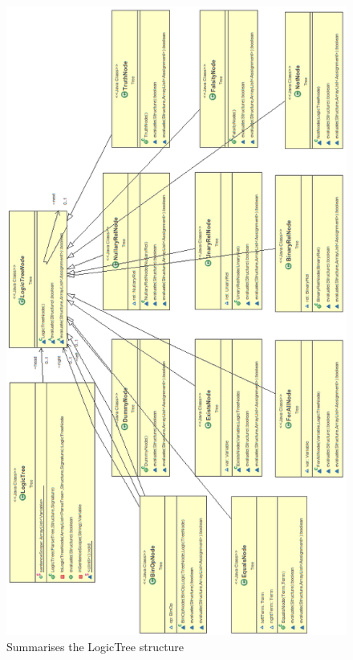 \documentclass{report}
\begin{document}
\begin{figure}[h!]
\centering \includegraphics[height=\textheight]{treeNodes.png}
\caption{Summarises the LogicTree structure}
\end{figure}
\newpage

\newpage


\end{document}
